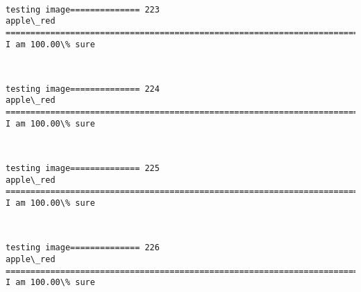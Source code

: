 \documentclass[11pt]{article}
\begin{document}
    \begin{center}
    \end{center}
    { \hspace*{\fill} \\}
    
    \begin{Verbatim}[commandchars=\\\{\}]
testing image============== 223
apple\_red
============================================================================
I am 100.00\% sure

    \end{Verbatim}

    \begin{center}
    \end{center}
    { \hspace*{\fill} \\}
    
    \begin{Verbatim}[commandchars=\\\{\}]
testing image============== 224
apple\_red
============================================================================
I am 100.00\% sure

    \end{Verbatim}

    \begin{center}
    \end{center}
    { \hspace*{\fill} \\}
    
    \begin{Verbatim}[commandchars=\\\{\}]
testing image============== 225
apple\_red
============================================================================
I am 100.00\% sure

    \end{Verbatim}

    \begin{center}
    \end{center}
    { \hspace*{\fill} \\}
    
    \begin{Verbatim}[commandchars=\\\{\}]
testing image============== 226
apple\_red
============================================================================
I am 100.00\% sure

    \end{Verbatim}
\end{document}
